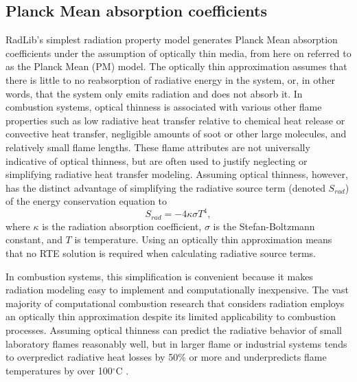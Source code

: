 \documentclass[preprint,12pt]{elsarticle}
\begin{document}

\subsection{Planck Mean absorption coefficients} \label{s:planckmean}

RadLib's simplest radiation property model generates Planck Mean absorption coefficients under the assumption of optically thin media, from here on referred to as the Planck Mean (PM) model.
The optically thin approximation assumes that there is little to no reabsorption of radiative energy in the system, or, in other words, that the system only emits radiation and does not absorb it. In combustion systems, optical thinness is associated with various other flame properties such as low radiative heat transfer relative to chemical heat release or convective heat transfer, negligible amounts of soot or other large molecules, and relatively small flame lengths. These flame attributes are not universally indicative of optical thinness, but are often used to justify neglecting or simplifying radiative heat transfer modeling. Assuming optical thinness, however, has the distinct advantage of simplifying the radiative source term (denoted $S_{rad}$) of the energy conservation equation to 
\begin{equation}
	S_{rad}=-4\kappa \sigma T^4,
\end{equation}
where $\kappa$ is the radiation absorption coefficient, $\sigma$ is the Stefan-Boltzmann constant, and $T$ is temperature. Using an optically thin approximation means that no RTE solution is required when calculating radiative source terms.

In combustion systems, this simplification is convenient because it makes radiation modeling easy to implement and computationally inexpensive. The vast majority of computational combustion research that considers radiation employs an optically thin approximation despite its limited applicability to combustion processes. Assuming optical thinness can predict the radiative behavior of small laboratory flames reasonably well, but in larger flame or industrial systems tends to overpredict radiative heat losses by 50\% or more and underpredicts flame temperatures by over 100$^{\circ}$C \citep{Modest_2016}. 
\end{document}
